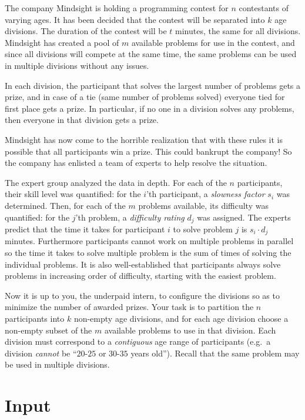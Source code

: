 
The company Mindsight is holding a programming contest for $n$ contestants of varying ages.
It has been decided that the contest will be separated into $k$ age divisions.
The duration of the contest will be $t$ minutes, the same for all divisions.
Mindsight has created a pool of $m$ available problems for use in the contest,
and since all divisions will compete at the same time, the same problems
can be used in multiple divisions without any issues.

In each division, the participant that solves the largest number of problems gets a prize,
and in case of a tie (same number of problems solved) everyone tied for first place gets a prize.
In particular, if no one in a division solves any problems, then everyone in that division gets a prize.

Mindsight has now come to the horrible realization that with these rules it
is possible that all participants win a prize. This could bankrupt the company!
So the company has enlisted a team of experts to help resolve the situation.

The expert group analyzed the data in depth.
For each of the $n$ participants, their skill level was quantified: for the $i$'th participant, a \emph{slowness factor} $s_i$ was determined.
Then, for each of the $m$ problems available, its difficulty was quantified: for the $j$'th problem, a \emph{difficulty rating} $d_j$ was assigned.
The experts predict that the time it takes for participant $i$ to solve problem $j$ is $s_i \cdot d_j$ minutes. Furthermore participants cannot work on multiple problems in parallel so the time it takes to solve multiple problem is the sum of times of solving the individual problems.
It is also well-established that participants always solve problems in increasing order
of difficulty, starting with the easiest problem.

Now it is up to you, the underpaid intern, to configure the divisions
so as to minimize the number of awarded prizes.  Your task is to
partition the $n$ participants into $k$ non-empty age divisions, and
for each age division choose a non-empty subset of the $m$ available
problems to use in that division.  Each division must correspond to
a \emph{contiguous} age range of participants (e.g.~a
division \emph{cannot} be ``$20$-$25$ or $30$-$35$ years
old''). Recall that the same problem may be used in multiple
divisions.

\section*{Input}


